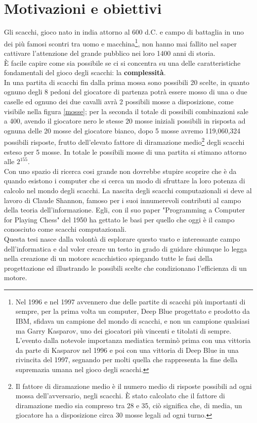 \section{Motivazioni e obiettivi}
Gli scacchi, gioco nato in india attorno al 600 d.C. e campo di battaglia in uno dei più famosi scontri tra uomo e macchina\footnote{Nel 1996 e nel 1997 avvennero due delle partite di scacchi più importanti di sempre,
 per la prima volta un computer, Deep Blue progettato e prodotto da IBM, sfidava un campione del mondo di scacchi, e non un campione qualsiasi ma Garry Kasparov, uno dei giocatori più vincenti e titolati di sempre. 
 L'evento dalla notevole importanza mediatica terminò prima con una vittoria da parte di Kasparov nel 1996 e poi con una vittoria di Deep Blue in una rivincita del 1997, segnando per molti quella che rappresenta la
  fine della supremazia umana nel gioco degli scacchi. }, non hanno mai fallito nel saper cattivare  l'attenzione del grande pubblico nei loro 1400 anni di storia.
 \\È facile capire come sia possibile se ci si concentra su una delle caratteristiche fondamentali del 
 gioco degli scacchi: la \textbf{complessità}.\\In una partita di scacchi fin dalla prima mossa 
sono possibili 20 scelte, in quanto ognuno degli 8 pedoni del giocatore di partenza potrà essere mosso di una o due caselle ed ognuno dei due cavalli avrà 2 possibili mosse a disposizione, come visibile nella figura \ref{mosse}; per la seconda il totale di possibili combinazioni sale a 400, avendo il giocatore nero le stesse 20 mosse iniziali possibili in risposta ad ognuna delle 20 mosse del giocatore bianco,
 dopo 5 mosse avremo 119,060,324 possibili risposte, frutto dell'elevato fattore di diramazione medio\footnote{ Il fattore di diramazione medio è il numero medio di risposte possibili ad ogni mossa dell'avversario, negli scacchi. È stato calcolato che il fattore di diramazione medio sia compreso tra 28 e 35, ciò significa che, di media, un giocatore ha a disposizione circa 30 mosse legali ad ogni turno.} degli scacchi esteso per 5 mosse. In totale le possibili mosse di una partita si stimano attorno alle \(2^{155} \).
 \\Con uno spazio di ricerca cosi grande non dovrebbe stupire scoprire che è da quando esistono i computer che si cerca un modo
 di sfruttare la loro potenza di calcolo nel mondo degli scacchi.
 La nascita degli scacchi computazionali si deve al lavoro di Claude Shannon, famoso per i suoi innumerevoli contributi al 
 campo della teoria dell'informazione. Egli, con il suo paper "Programming a Computer for Playing Chess"\cite{shannon} del 1950 ha gettato le
 basi per quello che oggi è il campo conosciuto come scacchi computazionali.
 \\Questa tesi nasce dalla volontà di esplorare questo vasto e interessante campo dell'informatica e dal voler creare un testo
 in grado di guidare chiunque lo legga nella creazione di un motore scacchistico spiegando tutte le fasi della progettazione
 ed illustrando le possibili scelte che condizionano l'efficienza di un motore.


